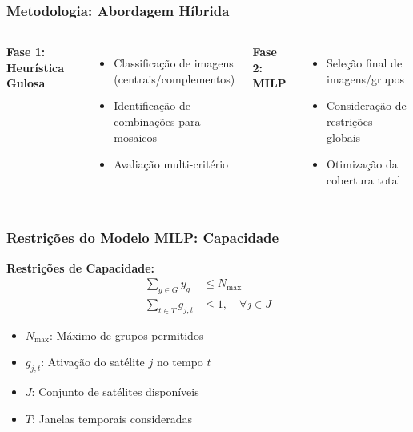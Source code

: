 \documentclass{beamer}
\begin{document}
\begin{frame}
    \frametitle{Metodologia: Abordagem Híbrida}
    \begin{columns}
        \textbf{Fase 1: Heurística Gulosa}
        \begin{itemize}
            \item Classificação de imagens (centrais/complementos)
            \item Identificação de combinações para mosaicos
            \item Avaliação multi-critério
        \end{itemize}
        
        \textbf{Fase 2: MILP}
        \begin{itemize}
            \item Seleção final de imagens/grupos
            \item Consideração de restrições globais
            \item Otimização da cobertura total
        \end{itemize}
    \end{columns}
    
    \vspace{0.3cm}
    \centering
\end{frame}

\begin{frame}
    \frametitle{Restrições do Modelo MILP: Capacidade}
    \textbf{Restrições de Capacidade:}
    {\small \begin{align}
        \sum_{g \in G} y_g &\leq N_{\max} \\
        \sum_{t \in T} g_{j,t} &\leq 1, \quad \forall j \in J
    \end{align}}
    \begin{itemize}\setlength{\itemsep}{0pt}\small
        \item $N_{\max}$: Máximo de grupos permitidos
        \item $g_{j,t}$: Ativação do satélite $j$ no tempo $t$
        \item $J$: Conjunto de satélites disponíveis
        \item $T$: Janelas temporais consideradas
    \end{itemize}
\end{frame}
\end{document}

